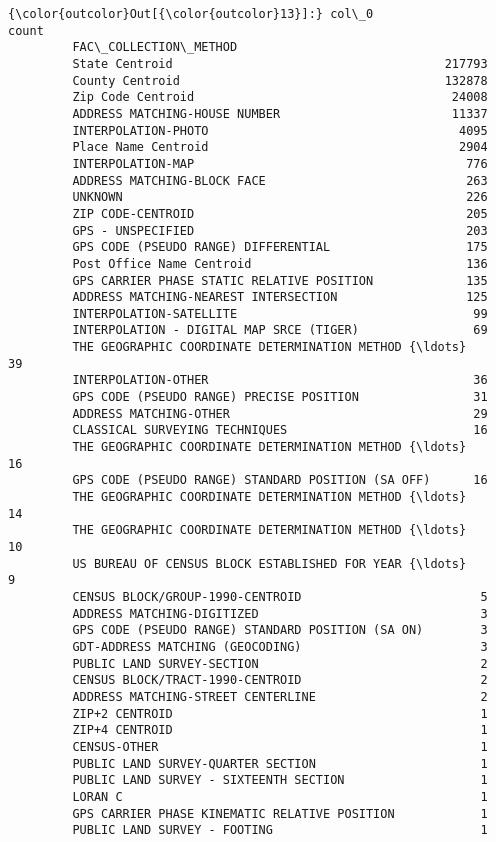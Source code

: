 \documentclass[11pt]{article}
\begin{document}
\begin{Verbatim}[commandchars=\\\{\}]
{\color{outcolor}Out[{\color{outcolor}13}]:} col\_0                                                count
         FAC\_COLLECTION\_METHOD                                     
         State Centroid                                      217793
         County Centroid                                     132878
         Zip Code Centroid                                    24008
         ADDRESS MATCHING-HOUSE NUMBER                        11337
         INTERPOLATION-PHOTO                                   4095
         Place Name Centroid                                   2904
         INTERPOLATION-MAP                                      776
         ADDRESS MATCHING-BLOCK FACE                            263
         UNKNOWN                                                226
         ZIP CODE-CENTROID                                      205
         GPS - UNSPECIFIED                                      203
         GPS CODE (PSEUDO RANGE) DIFFERENTIAL                   175
         Post Office Name Centroid                              136
         GPS CARRIER PHASE STATIC RELATIVE POSITION             135
         ADDRESS MATCHING-NEAREST INTERSECTION                  125
         INTERPOLATION-SATELLITE                                 99
         INTERPOLATION - DIGITAL MAP SRCE (TIGER)                69
         THE GEOGRAPHIC COORDINATE DETERMINATION METHOD {\ldots}      39
         INTERPOLATION-OTHER                                     36
         GPS CODE (PSEUDO RANGE) PRECISE POSITION                31
         ADDRESS MATCHING-OTHER                                  29
         CLASSICAL SURVEYING TECHNIQUES                          16
         THE GEOGRAPHIC COORDINATE DETERMINATION METHOD {\ldots}      16
         GPS CODE (PSEUDO RANGE) STANDARD POSITION (SA OFF)      16
         THE GEOGRAPHIC COORDINATE DETERMINATION METHOD {\ldots}      14
         THE GEOGRAPHIC COORDINATE DETERMINATION METHOD {\ldots}      10
         US BUREAU OF CENSUS BLOCK ESTABLISHED FOR YEAR {\ldots}       9
         CENSUS BLOCK/GROUP-1990-CENTROID                         5
         ADDRESS MATCHING-DIGITIZED                               3
         GPS CODE (PSEUDO RANGE) STANDARD POSITION (SA ON)        3
         GDT-ADDRESS MATCHING (GEOCODING)                         3
         PUBLIC LAND SURVEY-SECTION                               2
         CENSUS BLOCK/TRACT-1990-CENTROID                         2
         ADDRESS MATCHING-STREET CENTERLINE                       2
         ZIP+2 CENTROID                                           1
         ZIP+4 CENTROID                                           1
         CENSUS-OTHER                                             1
         PUBLIC LAND SURVEY-QUARTER SECTION                       1
         PUBLIC LAND SURVEY - SIXTEENTH SECTION                   1
         LORAN C                                                  1
         GPS CARRIER PHASE KINEMATIC RELATIVE POSITION            1
         PUBLIC LAND SURVEY - FOOTING                             1
\end{Verbatim}
            
\end{document}
